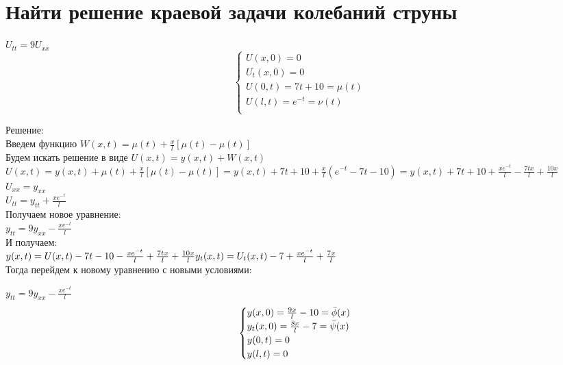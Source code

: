 \documentclass{article}
\begin{document}
    \section{Найти решение краевой задачи колебаний струны}
    \begin{center}
        $ U_{tt} = 9U_{xx} $ \\
        \begin{equation*} 
            \begin{cases}
                U(x, 0) = 0 \\
                U_t(x, 0) = 0 \\
                U(0, t) = 7 t + 10 = \mu(t) \\
                U(l, t) = e^{-t} = \nu(t) \\
            \end{cases}
		\end{equation*}
    \end{center}
    Решение: \\
    Введем функцию $ W(x, t) = \mu(t) + \frac{x}{l}[\mu(t) - \mu(t)] $ \\
    Будем искать решение в виде $ U(x, t) = y(x, t) + W(x, t) $ \\
    $ U(x, t)
    = y(x, t) + \mu(t) + \frac{x}{l}[\mu(t) - \mu(t)]
    = y(x, t) + 7 t + 10 + \frac{x}{l}( e^{-t} - 7 t - 10)
    = y(x, t) + 7t + 10 + \frac{x e^{-t}}{l} - \frac{ 7tx }{l} + \frac{ 10x }{l}
    $ \\
    $ U_{xx} = y_{xx} $ \\
    $ U_{tt} = y_{tt} + \frac{x e^{-t}}{l} $ \\
    Получаем новое уравнение: \\
    $ y_{tt} = 9y_{xx} - \frac{x e^{-t}}{l} $ \\
    И получаем: \\
    $
        y(x, t) = U(x, t) - 7t - 10 - \frac{x e^{-t}}{l} + \frac{7tx}{l} + \frac{10x}{l} \\
        y_t(x, t) = U_t(x, t) - 7 + \frac{x e^{-t}}{l} + \frac{7x}{l}
    $ \\
    Тогда перейдем к новому уравнению с новыми условиями: \\
    \begin{center}
        $ y_{tt} = 9y_{xx} - \frac{x e^{-t}}{l} $ \\
        \begin{equation*} 
            \begin{cases}
                y(x, 0) = \frac{9x}{l} - 10 = \Bar{\phi}(x) \\
                y_t(x, 0) = \frac{8x}{l} - 7 = \Bar{\psi}(x) \\
                y(0, t) = 0 \\
                y(l, t) = 0 \\
            \end{cases}
		\end{equation*}
    \end{center}
\end{document}
